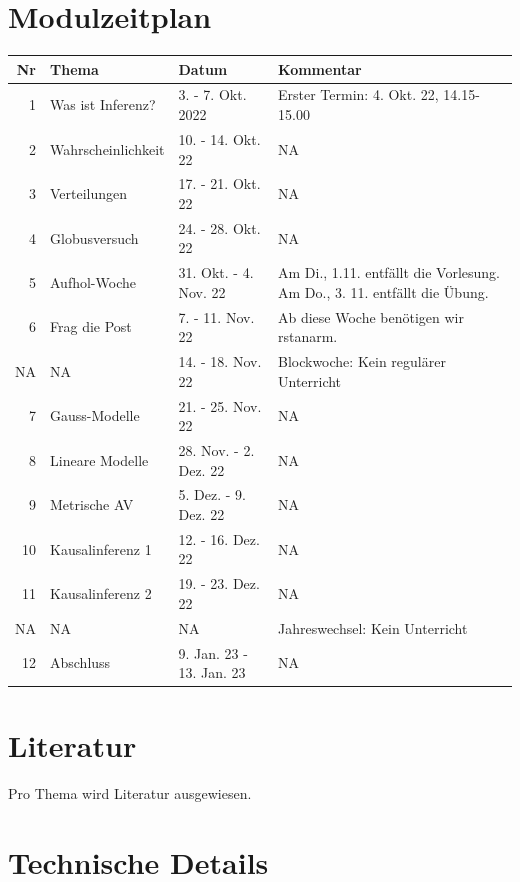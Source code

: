 \documentclass[
  a4paper,
  DIV=11]{scrreprt}
\theoremstyle{definition}
\theoremstyle{remark}
\begin{document}
\hypertarget{modulzeitplan}{%
\section*{Modulzeitplan}\label{modulzeitplan}}

\begin{longtable}{rlll}
\toprule
Nr & Thema & Datum & Kommentar \\ 
\midrule
1 & Was ist Inferenz? & 3. - 7. Okt. 2022 & Erster Termin: 4. Okt. 22, 14.15-15.00 \\ 
2 & Wahrscheinlichkeit & 10. - 14. Okt. 22 & NA \\ 
3 & Verteilungen & 17. - 21. Okt. 22 & NA \\ 
4 & Globusversuch & 24. - 28. Okt. 22 & NA \\ 
5 & Aufhol-Woche & 31. Okt. - 4. Nov. 22 & Am Di., 1.11. entfällt die Vorlesung. Am Do., 3. 11. entfällt die Übung. \\ 
6 & Frag die Post & 7. - 11. Nov. 22 & Ab diese Woche benötigen wir rstanarm. \\ 
NA & NA & 14. - 18. Nov. 22 & Blockwoche: Kein regulärer Unterricht \\ 
7 & Gauss-Modelle & 21. - 25. Nov. 22 & NA \\ 
8 & Lineare Modelle & 28. Nov. - 2. Dez. 22 & NA \\ 
9 & Metrische AV & 5. Dez. - 9. Dez. 22 & NA \\ 
10 & Kausalinferenz 1 & 12. - 16. Dez. 22 & NA \\ 
11 & Kausalinferenz 2 & 19. - 23. Dez. 22 & NA \\ 
NA & NA & NA & Jahreswechsel: Kein Unterricht \\ 
12 & Abschluss & 9. Jan. 23 - 13. Jan. 23 & NA \\ 
\bottomrule
\end{longtable}

\hypertarget{literatur}{%
\section*{Literatur}\label{literatur}}

Pro Thema wird Literatur ausgewiesen.

\hypertarget{technische-details}{%
\section*{Technische Details}\label{technische-details}}
\end{document}
